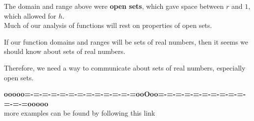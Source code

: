 \documentclass{ximera}
\begin{document}
The domain and range above were \textbf{\textcolor{purple!85!blue}{open sets}}, which gave space between $r$ and $1$, which allowed for $h$. \\

Much of our analysis of functions will rest on properties of open sets. \


If our function domains and ranges will be sets of real numbers, then it seems we should know about sets of real numbers.

Therefore, we need a way to communicate about sets of real numbers, especially open sets.















\begin{center}
\textbf{\textcolor{green!50!black}{ooooo=-=-=-=-=-=-=-=-=-=-=-=-=ooOoo=-=-=-=-=-=-=-=-=-=-=-=-=ooooo}} \\

more examples can be found by following this link\\ 

\end{center}
\end{document}
